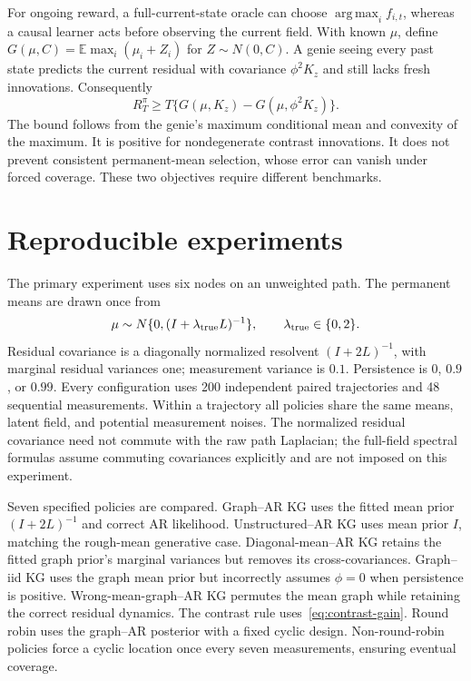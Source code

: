 \documentclass[11pt]{article}
\newcommand{\E}{\mathbb E}
\newcommand{\argmax}{\operatorname*{arg\,max}}
\begin{document}
For ongoing reward, a full-current-state oracle can choose $\argmax_i f_{i,t}$, whereas a causal learner acts before observing the current field. With known $\mu$, define $G(\mu,C)=\E\max_i(\mu_i+Z_i)$ for $Z\sim N(0,C)$. A genie seeing every past state predicts the current residual with covariance $\phi^2K_z$ and still lacks fresh innovations. Consequently
\begin{equation}
R_T^\pi\ge T\{G(\mu,K_z)-G(\mu,\phi^2K_z)\}.
\end{equation}
The bound follows from the genie's maximum conditional mean and convexity of the maximum. It is positive for nondegenerate contrast innovations. It does not prevent consistent permanent-mean selection, whose error can vanish under forced coverage. These two objectives require different benchmarks.

\section{Reproducible experiments}
The primary experiment uses six nodes on an unweighted path. The permanent means are drawn once from
\[
\mu\sim N\{0,(I+\lambda_{\rm true}L)^{-1}\},\qquad
\lambda_{\rm true}\in\{0,2\}.
\]
Residual covariance is a diagonally normalized resolvent $(I+2L)^{-1}$, with marginal residual variances one; measurement variance is $0.1$. Persistence is $0$, $0.9$, or $0.99$. Every configuration uses 200 independent paired trajectories and 48 sequential measurements. Within a trajectory all policies share the same means, latent field, and potential measurement noises. The normalized residual covariance need not commute with the raw path Laplacian; the full-field spectral formulas assume commuting covariances explicitly and are not imposed on this experiment.

Seven specified policies are compared. Graph--AR KG uses the fitted mean prior $(I+2L)^{-1}$ and correct AR likelihood. Unstructured--AR KG uses mean prior $I$, matching the rough-mean generative case. Diagonal-mean--AR KG retains the fitted graph prior's marginal variances but removes its cross-covariances. Graph--iid KG uses the graph mean prior but incorrectly assumes $\phi=0$ when persistence is positive. Wrong-mean-graph--AR KG permutes the mean graph while retaining the correct residual dynamics. The contrast rule uses~\eqref{eq:contrast-gain}. Round robin uses the graph--AR posterior with a fixed cyclic design. Non-round-robin policies force a cyclic location once every seven measurements, ensuring eventual coverage.
\end{document}
